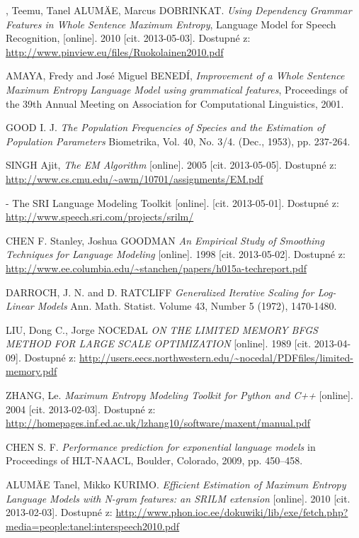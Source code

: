 \begin{thebibliography}{99}
, Teemu, Tanel ALUMÄE, Marcus DOBRINKAT. \emph{Using Dependency Grammar Features in Whole Sentence Maximum Entropy}, Language Model for Speech Recognition,
 [online]. 2010
  [cit. 2013-05-03].
  Dostupné z: \url{http://www.pinview.eu/files/Ruokolainen2010.pdf}  

{\sc AMAYA}, Fredy and José Miguel {\sc BENEDÍ}, \emph{Improvement of a Whole Sentence Maximum Entropy Language Model using grammatical features},
Proceedings of the 39th Annual Meeting on Association for Computational Linguistics, 2001.

{\sc GOOD} I. J. \emph{The Population Frequencies of Species and the Estimation of Population Parameters} Biometrika, Vol. 40, No. 3/4. (Dec., 1953), pp. 237-264.

{\sc SINGH} Ajit, \emph{The EM Algorithm}
[online]. 2005
  [cit. 2013-05-05].
  Dostupné z: \url{http://www.cs.cmu.edu/~awm/10701/assignments/EM.pdf}  



 - The SRI Language Modeling Toolkit
 [online].
  [cit. 2013-05-01].
  Dostupné z: \url{http://www.speech.sri.com/projects/srilm/}  
  
{\sc CHEN} F. Stanley, Joshua {\sc GOODMAN} \emph{ An Empirical Study of Smoothing Techniques for Language Modeling}
 [online]. 1998
  [cit. 2013-05-02].
  Dostupné z: \url{http://www.ee.columbia.edu/~stanchen/papers/h015a-techreport.pdf}  
  
{\sc DARROCH}, J. N. and {\sc D. RATCLIFF} \emph{Generalized Iterative Scaling for Log-Linear Models} Ann. Math. Statist. Volume 43, Number 5 (1972), 1470-1480.  

{\sc LIU}, Dong C., Jorge {\sc NOCEDAL} \emph{ ON THE LIMITED MEMORY BFGS METHOD FOR
LARGE SCALE OPTIMIZATION}
 [online]. 1989
  [cit. 2013-04-09].
  Dostupné z: \url{http://users.eecs.northwestern.edu/~nocedal/PDFfiles/limited-memory.pdf}

{\sc ZHANG}, Le. \emph{Maximum Entropy Modeling Toolkit for Python and C++}
[online]. 2004
  [cit. 2013-02-03].
  Dostupné z: \url{http://homepages.inf.ed.ac.uk/lzhang10/software/maxent/manual.pdf}
  
{\sc CHEN} S. F. \emph{Performance prediction for exponential language models} in Proceedings of HLT-NAACL, Boulder, Colorado, 2009, pp. 450–458.  

{\sc ALUMÄE} Tanel, Mikko {\sc KURIMO}. \emph{Efficient Estimation of Maximum Entropy Language Models with {N}-gram features: an {SRILM} extension}
[online]. 2010
  [cit. 2013-02-03].
  Dostupné z: \url{http://www.phon.ioc.ee/dokuwiki/lib/exe/fetch.php?media=people:tanel:interspeech2010.pdf}


\end{thebibliography}
